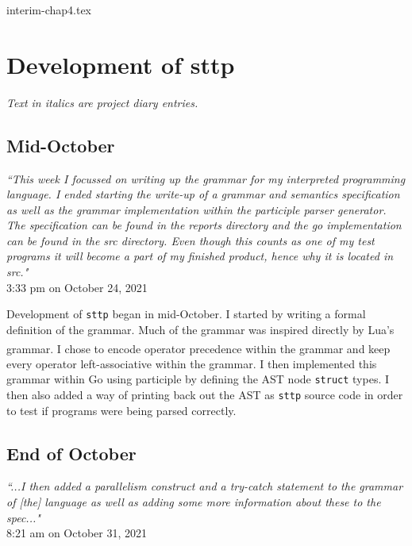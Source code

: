 \documentclass[]{interim}
\theoremstyle{definition}
\begin{document}
{interim-chap4.tex}

\chapter{Development of sttp}

\vspace{-2em}

\textit{Text in italics are project diary entries.}

\section{Mid-October}

\begin{center}
    \textit{``This week I focussed on writing up the grammar for my interpreted programming language. I ended starting the write-up of a grammar and semantics specification as well as the grammar implementation within the participle parser generator. The specification can be found in the reports directory and the go implementation can be found in the src directory. Even though this counts as one of my test programs it will become a part of my finished product, hence why it is located in src."}\\[0.5em]
    \tiny{3:33 pm on October 24, 2021}
\end{center}

Development of \verb|sttp| began in mid-October. I started by writing a formal definition of the grammar. Much of the grammar was inspired directly by Lua's grammar\textsuperscript{\cite{ierusalimschy_henrique-de-figueiredo_celes_2020}}. I chose to encode operator precedence within the grammar and keep every operator left-associative within the grammar. I then implemented this grammar within Go using participle by defining the AST node \verb|struct| types. I then also added a way of printing back out the AST as \verb|sttp| source code in order to test if programs were being parsed correctly.

\section{End of October}

\begin{center}
    \textit{``...I then added a parallelism construct and a try-catch statement to the grammar of [the] language as well as adding some more information about these to the spec..."}\\[0.5em]
    \tiny{8:21 am on October 31, 2021}
\end{center}
\end{document}
